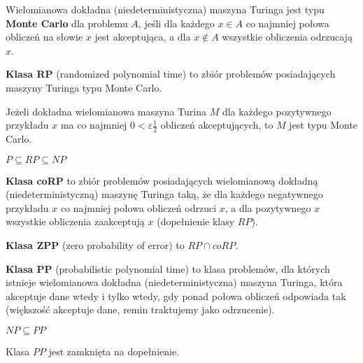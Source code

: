 \begin{definicja}
    Wielomianowa dokładna (niedeterministyczna) maszyna Turinga jest typu
    \textbf{Monte Carlo} dla problemu $A$, jeśli dla każdego $x \in A$ co najmniej
    połowa obliczeń na słowie $x$ jest akceptująca, a dla $x \notin A$
    wszystkie obliczenia odrzucają $x$.
\end{definicja}

\begin{definicja}
    \textbf{Klasa RP} (randomized polynomial time) to zbiór problemów posiadających
    maszyny Turinga typu Monte Carlo.
\end{definicja}

\begin{lemat}
    Jeżeli dokładna wielomianowa maszyna Turina $M$ dla każdego pozytywnego przykładu $x$
    ma co najmniej $0 < \varepsilon \frac{1}{2}$ obliczeń akceptujących, to $M$ jest typu Monte Carlo.
\end{lemat}

\begin{lemat}
    $P \subseteq RP \subseteq NP$
\end{lemat}

\begin{definicja}
    \textbf{Klasa coRP} to zbiór problemów posiadających wielomianową dokładną (niedeterministyczną)
    maszynę Turinga taką, że dla każdego negatywnego przykładu $x$ co najmniej połowa obliczeń odrzuci $x$,
    a dla pozytywnego $x$ wszystkie obliczenia zaakceptują $x$ (dopełnienie klasy $RP$).
\end{definicja}

\begin{definicja}
    \textbf{Klasa ZPP} (zero probability of error) to $RP \cap coRP$.
\end{definicja}

\begin{definicja}
    \textbf{Klasa PP} (probabilistic polynomial time) to klasa problemów, dla których istnieje wielomianowa
    dokładna (niedeterministyczna) maszyna Turinga, która akceptuje dane wtedy i tylko wtedy,
    gdy ponad połowa obliczeń odpowiada tak (większość akceptuje dane, remin traktujemy jako odrzucenie).
\end{definicja}

\begin{twierdzenie}
    $NP \subseteq PP$
\end{twierdzenie}

\begin{lemat}
    Klasa $PP$ jest zamknięta na dopełnienie.
\end{lemat}

